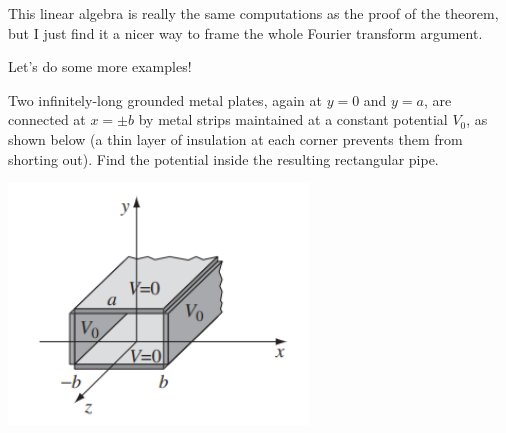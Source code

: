 \begin{remark}
This linear algebra is really the same computations as the proof of the theorem, but I just find it a nicer way to frame the whole Fourier transform argument.
\end{remark}

Let's do some more examples!

\begin{example}
Two infinitely-long grounded metal plates, again at $y = 0$ and $y = a$, are connected at $x = \pm b$ by metal strips maintained at a constant potential $V_0$, as shown below (a thin layer of insulation at each corner prevents them from shorting out). Find the potential inside the resulting rectangular pipe.
\end{example}

\begin{center}
    \includegraphics[width=8cm]{Electrodynamics/images/fig3.20.PNG}
\end{center}


